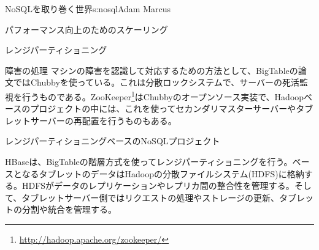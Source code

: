 \begin{aosachapter}{NoSQLを取り巻く世界}{s:nosql}{Adam Marcus}
\begin{aosasect1}{パフォーマンス向上のためのスケーリング}
\begin{aosasect2}{レンジパーティショニング}
\begin{aosasect3}{障害の処理}
マシンの障害を認識して対応するための方法として、BigTableの論文ではChubbyを使っている。これは分散ロックシステムで、サーバーの死活監視を行うものである。ZooKeeper\footnote{\url{http://hadoop.apache.org/zookeeper/}}はChubbyのオープンソース実装で、Hadoopベースのプロジェクトの中には、これを使ってセカンダリマスターサーバーやタブレットサーバーの再配置を行うものもある。

\end{aosasect3}

\begin{aosasect3}{レンジパーティショニングベースのNoSQLプロジェクト}

HBaseは、BigTableの階層方式を使ってレンジパーティショニングを行う。ベースとなるタブレットのデータはHadoopの分散ファイルシステム(HDFS)に格納する。HDFSがデータのレプリケーションやレプリカ間の整合性を管理する。そして、タブレットサーバー側ではリクエストの処理やストレージの更新、タブレットの分割や統合を管理する。


\end{aosasect3}
\end{aosasect2}
\end{aosasect1}
\end{aosachapter}
